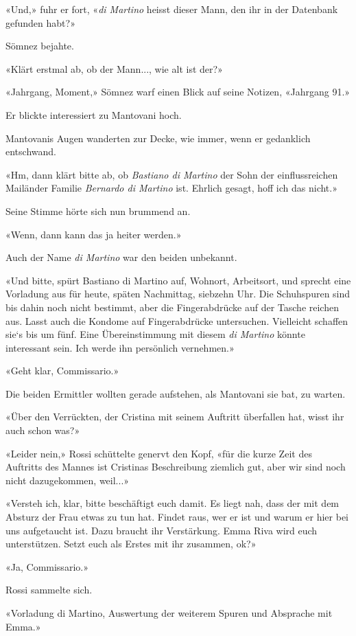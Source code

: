 «Und,» fuhr er fort, «\emph{di Martino} heisst dieser Mann, den ihr in
der Datenbank gefunden habt?»

Sömnez bejahte.

«Klärt erstmal ab, ob der Mann..., wie alt ist der?»

«Jahrgang, Moment,» Sömnez warf einen Blick auf seine Notizen, «Jahrgang
91.»

Er blickte interessiert zu Mantovani hoch.

Mantovanis Augen wanderten zur Decke, wie immer, wenn er gedanklich
entschwand.

«Hm, dann klärt bitte ab, ob \emph{Bastiano di Martino} der Sohn der
einflussreichen Mailänder Familie \emph{Bernardo di Martino} ist.
Ehrlich gesagt, hoff ich das nicht.»

Seine Stimme hörte sich nun brummend an.

«Wenn, dann kann das ja heiter werden.»

Auch der Name \emph{di Martino} war den beiden unbekannt.

«Und bitte, spürt Bastiano di Martino auf, Wohnort, Arbeitsort, und
sprecht eine Vorladung aus für heute, späten Nachmittag, siebzehn Uhr.
Die Schuhspuren sind bis dahin noch nicht bestimmt, aber die
Fingerabdrücke auf der Tasche reichen aus. Lasst auch die Kondome auf
Fingerabdrücke untersuchen. Vielleicht schaffen sie`s bis um fünf. Eine
Übereinstimmung mit diesem \emph{di Martino} könnte interessant sein.
Ich werde ihn persönlich vernehmen.»

«Geht klar, Commissario.»

Die beiden Ermittler wollten gerade aufstehen, als Mantovani sie bat, zu
warten.

«Über den Verrückten, der Cristina mit seinem Auftritt überfallen hat,
wisst ihr auch schon was?»

«Leider nein,» Rossi schüttelte genervt den Kopf, «für die kurze Zeit
des Auftritts des Mannes ist Cristinas Beschreibung ziemlich gut, aber
wir sind noch nicht dazugekommen, weil...»

«Versteh ich, klar, bitte beschäftigt euch damit. Es liegt nah, dass der
mit dem Absturz der Frau etwas zu tun hat. Findet raus, wer er ist und
warum er hier bei uns aufgetaucht ist. Dazu braucht ihr Verstärkung.
Emma Riva wird euch unterstützen. Setzt euch als Erstes mit ihr
zusammen, ok?»

«Ja, Commissario.»

Rossi sammelte sich.

«Vorladung di Martino, Auswertung der weiterem Spuren und Absprache mit
Emma.»

